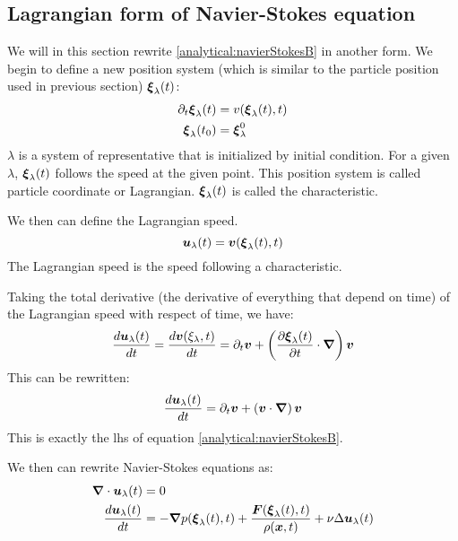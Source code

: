 \subsection{Lagrangian form of Navier-Stokes equation}
\label{analytical:convectif}
We will in this section rewrite \ref{analytical:navierStokesB} in another form.
We begin to define a new position system (which is similar to the particle position used in previous section) ${\boldsymbol {\xi}}_{\lambda}(t)$:
\begin{subequations}
\begin{align}
 \partial_t {\boldsymbol {\xi}}_{\lambda}(t)&=v({\boldsymbol {\xi}}_{\lambda}(t),t)\\
 {\boldsymbol {\xi}}_{\lambda}(t_0)&={\boldsymbol {\xi}}^{0}_{\lambda}
\end{align}
\end{subequations}
$\lambda$ is a system of representative that is initialized by initial condition.
For a given $\lambda$, ${\boldsymbol {\xi}}_{\lambda}(t)$ follows the speed at the given point.
This position system is called particle coordinate or Lagrangian.
${\boldsymbol {\xi}}_\lambda(t)$ is called the characteristic.

We then can define the Lagrangian speed.
\begin{equation}
 {\boldsymbol {u}}_{\lambda}(t)={\boldsymbol {v}}({\boldsymbol {\xi}}_{\lambda}(t),t)
\end{equation}
The Lagrangian speed is the speed following a characteristic.

Taking the total derivative (the derivative of everything that depend on time) of the Lagrangian speed with respect of time, we have:
\begin{equation}
\frac{d {\boldsymbol {u}}_{\lambda}(t)}{d t}=\frac{d {\boldsymbol {v}}(\xi_{\lambda},t)}{d t}=\partial_t {\boldsymbol {v}}+\left(\frac{\partial {\boldsymbol {\xi}}_{\lambda}(t)}{\partial t}\cdot{\boldsymbol {\nabla}}\right){\boldsymbol {v}}
\end{equation}
This can be rewritten:
\begin{equation}
\frac{d {\boldsymbol {u}}_{\lambda}(t)}{d t}=\partial_t {\boldsymbol {v}}+\left({\boldsymbol {v}} \cdot{\boldsymbol {\nabla}}\right){\boldsymbol {v}}
\end{equation}
This is exactly the lhs of equation \ref{analytical:navierStokesB}.

We then can rewrite Navier-Stokes equations as:
\begin{subequations}
\begin{align}
\label{analytical:navierStokesLagA}
{\boldsymbol {\nabla}} \cdot {\boldsymbol {u}}_{\lambda}(t)&=0\\
\label{analytical:navierStokesLagB}
\frac{d {\boldsymbol {u}}_{\lambda}(t)}{d t}&=-{\boldsymbol {\nabla}} p({\boldsymbol {\xi}}_{\lambda}(t),t)+\frac{{\boldsymbol {F}}({\boldsymbol {\xi}}_{\lambda}(t),t)}{\rho({\boldsymbol {x}},t)}+\nu \Delta {\boldsymbol {u}}_{\lambda}(t)
\end{align}
\end{subequations}

